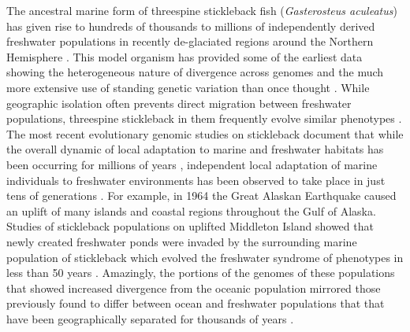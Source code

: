\documentclass{article}
\begin{document}
The ancestral marine form of threespine stickleback fish (\textit{Gasterosteus aculeatus}) 
has given rise to hundreds of thousands to millions of independently derived freshwater populations 
in recently de-glaciated regions around the Northern Hemisphere 
\citep{Bell_1994, Thompson_1997, Cresko_2007, Hunt_2008}. 
This model organism has provided some of the earliest data showing the heterogeneous nature of divergence across genomes 
and the much more extensive use of standing genetic variation than once thought 
\citep{schluter2009genetics, DeFaveri_2011, DeFaveri_2013, Roesti_2014, Nelson_2018, Bassham_2018, Nelson_2019, Hohenlohe_2010, Terekhanova_2014, Marques_2016}.  
While geographic isolation often prevents direct migration between freshwater populations, threespine stickleback in them 
frequently evolve similar phenotypes \citep{Cresko_2004, Colosimo_2004, stuart2017contrasting, hanson2016testing, hanson2017heritable, hirase2014parallel}. 
The most recent evolutionary genomic studies on stickleback document that while the overall dynamic of local adaptation to marine and freshwater habitats has been occurring for millions of years 
\citep{Nelson_2018, Nelson_2019}, independent local adaptation of marine individuals to freshwater environments has been observed to take place in just tens of generations \citep{Terekhanova_2014, Lescak2015evolution, Bassham_2018}. 
For example, in 1964 the Great Alaskan Earthquake caused an uplift of many islands and coastal regions throughout the Gulf of Alaska. 
Studies of stickleback populations on uplifted Middleton Island showed that newly created freshwater ponds were invaded by the surrounding marine population of stickleback which evolved the freshwater syndrome of phenotypes in less than 50 years 
\citep{Lescak2015evolution, Bassham_2018}. 
Amazingly, the portions of the genomes of these populations that showed increased divergence from the oceanic population
mirrored those previously found to differ between ocean and freshwater populations that
that have been geographically separated for thousands of years 
\citep{Hohenlohe_2010, Bassham_2018}. 
\end{document}
